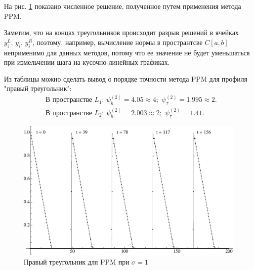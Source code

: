 \documentclass[12pt,a4paper]{article}
\newcommand{\picref}[1]{рис. \ref{#1}}
\begin{document}
    На \picref{fig:ppm_rightTriangle_1} показано численное решение, полученное путем применения метода PPM. 

    Заметим, что на концах треугольников происходит разрыв решений в ячейках $ y_i^L,\, y_i,\, y_i^R $, поэтому, например, вычисление нормы в пространтсве $C[a,b]$ неприменимо для данных методов, потому что ее значение не будет уменьшаться при измельчении шага на кусочно-линейных графиках.

    Из таблицы  можно сделать вывод о порядке точности метода PPM для профиля "правый треугольник":
    \[
        \begin{split}
        &\text{В пространстве $L_1$}\colon \, \psi_{h}^{(2)} = 4.05 \approx 4;\,\, \psi_{\tau}^{(2)} = 1.995 \approx 2.
        \\[0.5em]
        & \text{В пространстве $L_2$}\colon \, \psi_{h}^{(2)} = 2.003 \approx 2;\,\, \psi_{\tau}^{(2)} = 1.41.
        \end{split}
    \]
    \pagebreak


     \begin{figure}[h]
        \centering
        \includegraphics[width=\textwidth]{sigma=1./advectionPPM_rightTriangle.pdf}
        \caption{Правый треугольник для PPM при $ \sigma = 1 $}
        \label{fig:ppm_rightTriangle_1}
    \end{figure}
\end{document}
